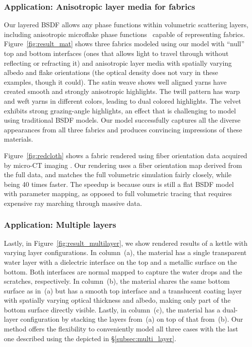 \subsubsection{Application: Anisotropic layer media for fabrics}
%
Our layered BSDF allows any phase functions within volumetric scattering layers, including anisotropic microflake phase functions~\cite{Jakob:2010:RTF,Zhao:2011:BVA,Heitz:2015:SMD} capable of representing fabrics.
Figure~\ref{fig:result_mat} shows three fabrics modeled using our model with ``null'' top and bottom interfaces (ones that allows light to travel through without reflecting or refracting it) and anisotropic layer media with spatially varying albedo and flake orientations (the optical density does not vary in these examples, though it could).
The satin weave shows well aligned yarns have created smooth and strongly anisotropic highlights. The twill pattern has warp and weft yarns in different colors, leading to dual colored highlights. The velvet exhibits strong grazing-angle highlights, an effect that is challenging to model using traditional BSDF models. Our model successfully captures all the diverse appearances from all three fabrics and produces convincing impressions of these materials.

Figure~\ref{fig:redcloth} shows a fabric rendered using fiber orientation data acquired by micro-CT imaging \cite{Zhao:2011:BVA}. Our rendering uses a fiber orientation map derived from the full data, and matches the full volumetric simulation fairly closely, while being 40 times faster. The speedup is because ours is still a flat BSDF model with parameter mapping, as opposed to full volumetric tracing that requires expensive ray marching through massive data.

\subsubsection{Application: Multiple layers}
%
Lastly, in Figure~\ref{fig:result_multilayer}, we show rendered results of a kettle with varying layer configurations.
In column~(a), the material has a single transparent water layer with a dielectric interface on the top and a metallic surface on the bottom.
Both interfaces are normal mapped to capture the water drops and the scratches, respectively.
In column~(b), the material shares the same bottom surface as in~(a) but has a smooth top interface and a translucent coating layer with spatially varying optical thickness and albedo, making only part of the bottom surface directly visible.
Lastly, in column~(c), the material has a dual-layer configuration by stacking the layers from~(a) on top of that from~(b).
Our method offers the flexibility to conveniently model all three cases with the last one described using the  depicted in \S\ref{subsec:multi_layer}.

